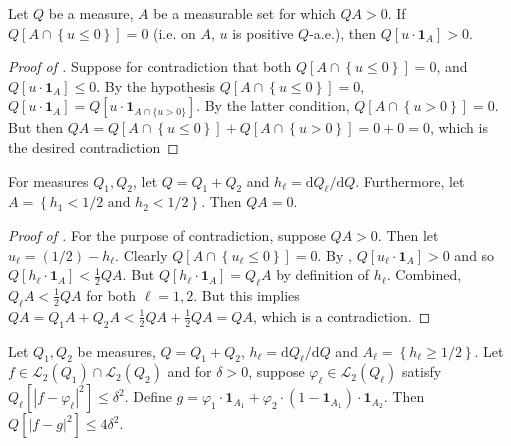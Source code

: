 \begin{lemma}
\label{lem--measure-non-null-positive-weight}
Let \(Q\) be a measure, \(A\) be a measurable set for which \(Q A > 0\).
If \(Q \left[ A \cap \left\{ u \leq 0 \right\} \right] = 0\) (i.e.  on \(A\),
\(u\) is positive \(Q\)-a.e.), then \(Q \left[ u \cdot \mathbf{1}_{A} \right] >
0\).
\end{lemma}

\begin{proof}[Proof of ]
Suppose for contradiction that both \(Q \left[ A \cap \left\{ u \leq 0 \right\}
\right] = 0\), and \(Q \left[ u \cdot \mathbf{1}_{A} \right] \leq 0\).
By the hypothesis \(Q \left[ A \cap \left\{ u \leq 0 \right\} \right] = 0\),
\(Q \left[ u \cdot \mathbf{1}_{A} \right] = Q \left[ u \cdot \mathbf{1}_{A \cap
\{u > 0\}} \right]\).
By the latter condition, \(Q \left[ A \cap \left\{ u > 0 \right\} \right] = 0\).
But then \(Q A = Q \left[ A \cap \left\{ u \leq 0 \right\} \right] + Q
\left[ A \cap \left\{ u > 0 \right\} \right] = 0 + 0 = 0\), which is the desired
contradiction
\end{proof}

\begin{lemma}
\label{lem--mixture-meas-densities-lt-half-null}
For measures \(Q_{1}, Q_{2}\), let \(Q = Q_{1} + Q_{2}\) and \(h_{\ell} =
\mathrm{d} Q_{\ell} / \mathrm{d} Q\).
Furthermore, let \(A = \left\{ h_{1} < 1 / 2 \text{ and } h_{2} < 1 / 2
\right\}\).
Then \(Q A = 0\).
\end{lemma}

\begin{proof}[Proof of ]
For the purpose of contradiction, suppose \(Q A > 0\).
Then let \(u_{\ell} = (1 / 2) - h_{\ell}\).
Clearly \(Q \left[ A \cap \left\{ u_{\ell} \leq 0 \right\} \right] = 0\).
By , \(Q \left[ u_{\ell} \cdot
\mathbf{1}_{A} \right] > 0\) and so
\(Q \left[ h_{\ell} \cdot \mathbf{1}_{A} \right] < \frac{1}{2} Q A\).
But \(Q \left[ h_{\ell} \cdot \mathbf{1}_{A} \right] = Q_{\ell} A\) by
definition of \(h_{\ell}\).
Combined, \(Q_{\ell} A < \frac{1}{2} Q A\) for both \(\ell = 1, 2\).
But this implies \(Q A = Q_{1} A + Q_{2} A < \frac{1}{2} Q A + \frac{1}{2} Q A =
Q A\), which is a contradiction.
\end{proof}

\begin{lemma}
\label{lem--L2-mixture-meas-approx}
Let \(Q_{1}, Q_{2}\) be measures, \(Q = Q_{1} + Q_{2}\), \(h_{\ell} =
\mathrm{d} Q_{\ell} / \mathrm{d} Q\) and \(A_{\ell} = \left\{ h_{\ell} \geq 1 /
2 \right\}\).
Let \(f \in \mathscr{L}_{2} \left( Q_{1} \right) \cap \mathscr{L}_{2} \left(
Q_{2} \right)\) and for \(\delta > 0\), suppose \(\varphi_{\ell} \in
\mathscr{L}_{2} \left( Q_{\ell} \right)\) satisfy \(Q_{\ell} \left[ \left| f -
\varphi_{\ell} \right|^{2} \right] \leq \delta^{2}\).
Define \(g = \varphi_{1} \cdot \mathbf{1}_{A_{1}} + \varphi_{2} \cdot \left( 1 -
\mathbf{1}_{A_{1}} \right) \cdot \mathbf{1}_{A_{2}}\).
Then \(Q \left[ \left| f - g \right|^{2} \right] \leq 4 \delta^{2}\).
\end{lemma}

